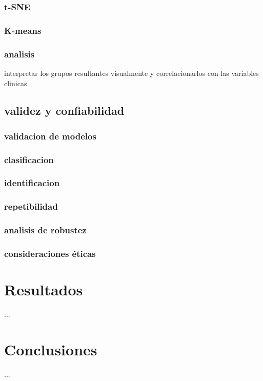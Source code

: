 \documentclass[12pt,letterpaper,oneside,openright]{book}
\begin{document}
\subsection{t-SNE}
\subsection{K-means}
\subsection{analisis} interpretar los grupos resultantes visualmente y correlacionarlos con las variables clinicas


\section{validez y confiabilidad}
\subsection{validacion de modelos}
\subsection{clasificacion}
\subsection{identificacion}
\subsection{repetibilidad}
\subsection{analisis de robustez}
\subsection{consideraciones éticas}

\chapter{Resultados}

...

\chapter{Conclusiones}

...


 
\end{document}
